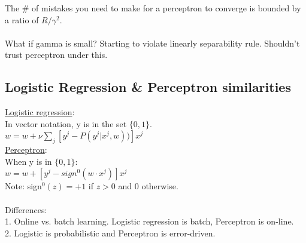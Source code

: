 The \# of mistakes you need to make for a perceptron to converge is bounded by a ratio of $R/\gamma^2$. \hfill \\
 \hfill \\

What if gamma is small?
    Starting to violate linearly separability rule. 
    Shouldn't trust perceptron under this. 


\subsection{Logistic Regression \& Perceptron similarities}
\underline{Logistic regression}:  \hfill \\
In vector notation, y is in the set $\{ 0, 1\}$. \hfill \\
$w = w + \nu \sum_j [y^j - P(y^j | x^j, w))] x^j$ \hfill \\

\underline{Perceptron}:  \hfill \\
When y is in $\{ 0, 1\}$: \hfill \\
$w = w + [y^j - sign^0(w \cdot x^j)] x^j$  \hfill \\
Note: sign$^0(z) =  + 1$ if $z > 0$ and 0 otherwise.  \hfill \\
\hfill \\
Differences:   \hfill \\
1. Online vs. batch learning.  Logistic regression is batch, Perceptron is on-line.  \hfill \\
2. Logistic is probabilistic and Perceptron is error-driven. 
 


